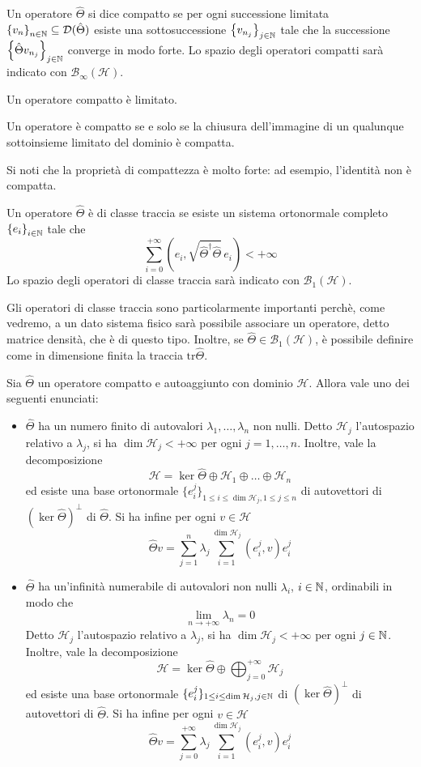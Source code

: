\documentclass[a4paper, 11pt]{article}
\renewcommand{\H}{\mathcal{H}}
\newcommand{\tr}{\mathrm{tr}}
\begin{document}
\begin{definition}
	Un operatore $\hat{\Theta}$ si dice compatto se per ogni successione limitata $\left\{v_n\right\}_{n\in\mathbb{N}}\subseteq\mathcal{D}(\hat{\Theta})$ esiste una sottosuccessione $\left\{v_{n_j}\right\}_{j\in\mathbb{N}}$ tale che la successione $\left\{\hat{\Theta}v_{n_j}\right\}_{j\in\mathbb{N}}$ converge in modo forte. Lo spazio degli operatori compatti sarà indicato con $\mathcal{B}_\infty(\H)$.
\end{definition}
\begin{lemma}
	Un operatore compatto è limitato.
\end{lemma}
\begin{lemma}
	Un operatore è compatto se e solo se la chiusura dell'immagine di un qualunque sottoinsieme limitato del dominio è compatta.
\end{lemma}
Si noti che la proprietà di compattezza è molto forte: ad esempio, l'identità non è compatta.
\begin{definition}
	Un operatore $\hat{\Theta}$ è di classe traccia se esiste un sistema ortonormale completo $\left\{e_i\right\}_{i\in\mathbb{N}}$ tale che
	\[\sum_{i=0}^{+\infty}(e_i,\sqrt{\hat{\Theta}^\dagger\hat{\Theta}}\,e_i)<+\infty\]
	Lo spazio degli operatori di classe traccia sarà indicato con $\mathcal{B}_1(\H)$.
\end{definition}
Gli operatori di classe traccia sono particolarmente importanti perchè, come vedremo, a un dato sistema fisico sarà possibile associare un operatore, detto matrice densità, che è di questo tipo. Inoltre, se $\hat{\Theta}\in\mathcal{B}_1(\H)$, è possibile definire come in dimensione finita la traccia $\tr\hat{\Theta}$.
\begin{theorem}
	Sia $\hat{\Theta}$ un operatore compatto e autoaggiunto con dominio $\H$. Allora vale uno dei seguenti enunciati:
	\begin{itemize}
		\item $\hat{\Theta}$ ha un numero finito di autovalori $\lambda_1,\dots,\lambda_n$ non nulli. Detto $\H_j$ l'autospazio relativo a $\lambda_j$, si ha $\dim\H_j<+\infty$ per ogni $j=1,\dots,n$. Inoltre, vale la decomposizione
		\[\H=\ker\hat{\Theta}\oplus \H_1\oplus\dots\oplus\H_n\]
		ed esiste una base ortonormale $\{e^j_i\}_{1\leq i\leq \dim\H_j,1\leq j\leq n}$ di autovettori di $(\ker \hat{\Theta})^\perp$ di $\hat{\Theta}$. Si ha infine per ogni $v\in\H$
		\[\hat{\Theta}v=\sum_{j=1}^{n}\lambda_j\sum_{i=1}^{\dim\H_j}(e^j_i,v)e^j_i\]
		\item $\hat{\Theta}$ ha un'infinità numerabile di autovalori non nulli $\lambda_i$, $i\in\mathbb{N}$, ordinabili in modo che
		\[\lim\limits_{n\to+\infty}\lambda_n=0\]
		Detto $\H_j$ l'autospazio relativo a $\lambda_j$, si ha $\dim\H_j<+\infty$ per ogni $j\in\mathbb{N}$. Inoltre, vale la decomposizione
		\[\H=\ker\hat{\Theta}\oplus\bigoplus_{j=0}^{+\infty}\H_j\]
		ed esiste una base ortonormale $\{e^j_i\}_{1\leq i\leq \dim\H_j,j\in\N}$ di $(\ker \hat{\Theta})^\perp$ di autovettori di $\hat{\Theta}$. Si ha infine per ogni $v\in\H$
		\[\hat{\Theta}v=\sum_{j=0}^{+\infty}\lambda_j\sum_{i=1}^{\dim\H_j}(e^j_i,v)e^j_i\]
	\end{itemize}
\end{theorem}
\end{document}
